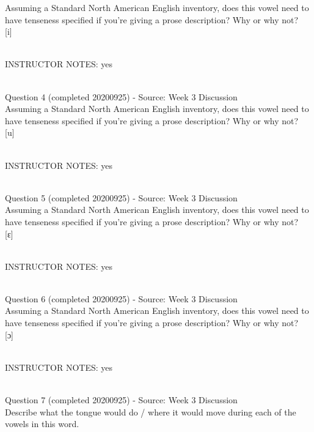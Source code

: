 \documentclass[12pt]{article}
\begin{document}
Assuming a Standard North American English inventory, does this vowel need to have tenseness specified if you're giving a prose description? Why or why not?\\

{[i]}


~\\
INSTRUCTOR NOTES: yes


~\\

{\large Question 4} (completed 20200925) - Source: Week 3 Discussion\\

Assuming a Standard North American English inventory, does this vowel need to have tenseness specified if you're giving a prose description? Why or why not?\\

{[u]}


~\\
INSTRUCTOR NOTES: yes


~\\

{\large Question 5} (completed 20200925) - Source: Week 3 Discussion\\

Assuming a Standard North American English inventory, does this vowel need to have tenseness specified if you're giving a prose description? Why or why not?\\

{[ɛ]}


~\\
INSTRUCTOR NOTES: yes


~\\

{\large Question 6} (completed 20200925) - Source: Week 3 Discussion\\

Assuming a Standard North American English inventory, does this vowel need to have tenseness specified if you're giving a prose description? Why or why not?\\

{[ɔ]}


~\\
INSTRUCTOR NOTES: yes


~\\

{\large Question 7} (completed 20200925) - Source: Week 3 Discussion\\

Describe what the tongue would do / where it would move during each of the vowels in this word.\\
\end{document}
